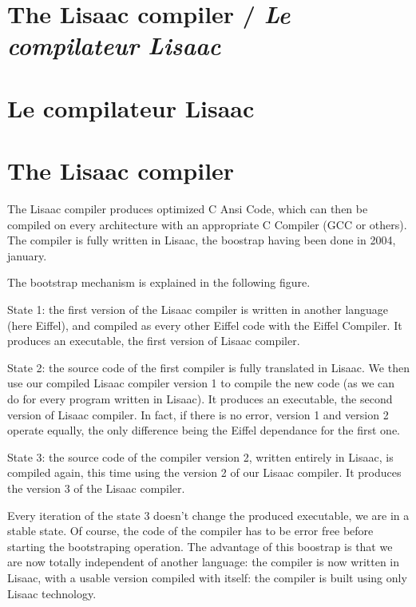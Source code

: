 \documentclass[11pt]{mybook}
\newcommand{\en}[1]
{
  \if \englishversion 1
  #1
  \fi
}
\newcommand{\sectionenfr}[2]
{
  \if \frenchversion 1
    \if \englishversion 1    
     \section{#1 / \textit{#2}}
    \else
      \section{#2}
    \fi
  \else
    \section{#1}
  \fi
}
\begin{document}
\sectionenfr{The Lisaac compiler}{Le compilateur Lisaac}
\label{introduction:compiler}
%
\en{The Lisaac compiler produces optimized C Ansi Code, which can then be
compiled on every architecture with an appropriate C Compiler (GCC or others).\\

The compiler is fully written in Lisaac, the boostrap having been done in 2004, january.

The bootstrap mechanism is explained in the following figure.

State 1: the first version of the Lisaac compiler is written in
another language (here Eiffel), and compiled as every other Eiffel
code with the Eiffel Compiler. 
It produces an executable, the first version of Lisaac compiler.

State 2: the source code of the first compiler is fully translated in Lisaac.
We then use our compiled Lisaac compiler version 1 to compile the new code
(as we can do for every program written in Lisaac). It produces an executable,
the second version of Lisaac compiler. In fact, if there is no error,
version 1 and version 2 operate equally, the only difference being the Eiffel
dependance for the first one.

State 3: the source code of the compiler version 2, written entirely in Lisaac,
is compiled again, this time using the version 2 of our Lisaac
compiler. It produces the version 3 of the Lisaac compiler.

Every iteration of the state 3 doesn't change the produced executable,
we are in a stable state. 
Of course, the code of the compiler has to be error free before
starting the bootstraping operation. 
The advantage of this boostrap is that we are now totally independent
of another language: the compiler is now written in Lisaac, with a
usable version compiled with itself: the compiler is built using only
Lisaac technology.
}
\end{document}
